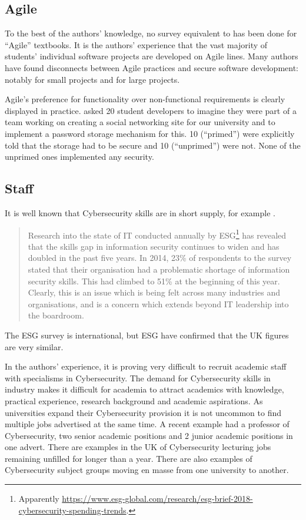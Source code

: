 \documentclass[conference]{IEEEtran}
\begin{document}
\subsection{Agile}
To the best of the authors' knowledge, no survey equivalent to \cite{Drop2019} has been done for ``Agile'' textbooks. It is the authors' experience that the vast majority of students' individual software projects are developed on Agile lines. Many authors have found disconnects between Agile practices and secure software development: notably \cite{Bartsch2011a} for small projects and \cite{vanderHeijden:2018:EPS:3239235.3267426} for large projects.
\par
Agile's preference for functionality over non-functional requirements is clearly displayed in practice. \cite{Naiakshinaetal2017a} asked 20 student developers to imagine they
were part of a team working on creating a social networking site for
our university and to implement a password storage mechanism for this. 10 (``primed'') were explicitly told that the storage had to be secure and 10 (``unprimed'') were not. None of the unprimed ones implemented any security.
\subsection{Staff}
It is well known that Cybersecurity skills are in short supply, for example \cite{Page2018a}.
\begin{quote}
Research into the state of IT conducted annually by ESG\footnote{Apparently \url{https://www.esg-global.com/research/esg-brief-2018-cybersecurity-spending-trends}.} has revealed that the skills gap in information security continues to widen and has doubled in the past five years. In 2014, 23\% of respondents to the survey stated that their organisation had a problematic shortage of information security skills. This had climbed to 51\% at the beginning of this year. Clearly, this is an issue which is being felt across many industries and organisations, and is a concern which extends beyond IT leadership into the boardroom.
\end{quote}
The ESG survey is international, but ESG have confirmed that the UK figures are very similar.

In the authors' experience, it is proving very difficult to recruit academic staff with specialisms in Cybersecurity. The demand for Cybersecurity skills in industry makes it difficult for academia to attract academics with knowledge, practical experience, research background and academic aspirations. As universities expand their Cybersecurity provision it is not uncommon to find multiple jobs advertised at the same time.  A recent example had a professor of Cybersecurity, two senior academic positions and 2 junior academic positions in one advert. There are examples in the UK of Cybersecurity lecturing jobs remaining unfilled for longer than a year. There are also examples of  Cybersecurity subject groups moving en masse from one university to another.
\end{document}
